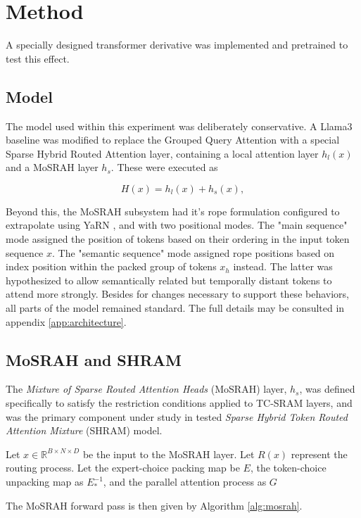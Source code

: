 \documentclass[11pt]{article}
\begin{document}
\section{Method}

A specially designed transformer derivative was implemented and pretrained to test this effect.

\subsection{Model}

The model used within this experiment was deliberately conservative. A Llama3 baseline was modified to replace the Grouped Query Attention with a special Sparse Hybrid Routed Attention layer, containing a local attention layer $h_l(x)$ and a MoSRAH layer $h_s$. These were executed as

\[
H(x) = h_l(x) + h_s(x),
\]

Beyond this, the MoSRAH subsystem had it's rope formulation configured to extrapolate using YaRN , and with two positional modes. \citep{peng2024yarn} The "main sequence" mode assigned the position of tokens based on their ordering in the input token sequence $x$. The "semantic sequence" mode assigned rope positions based on index position within the packed group of tokens $x_h$ instead. The latter was hypothesized to allow semantically related but temporally distant tokens to attend more strongly. Besides for changes necessary to support these behaviors, all parts of the model remained standard. The full details may be consulted in appendix \ref{app:architecture}.

\subsection{MoSRAH and SHRAM}

The \emph{Mixture of Sparse Routed Attention Heads} (MoSRAH) layer, $h_s$, was defined specifically to satisfy the restriction conditions applied to TC-SRAM layers, and was the primary component under study in tested \emph{Sparse Hybrid Token Routed Attention Mixture} (SHRAM) model.

Let $x \in \mathbb{R}^{B \times N \times D}$ be the input to the MoSRAH layer. Let $R(x)$ represent the routing process. Let the expert-choice packing map be $E$, the token-choice unpacking map as $E_*^{-1}$, and the parallel attention process as $G$

The MoSRAH forward pass is then given by Algorithm \ref{alg:mosrah}.
\end{document}
